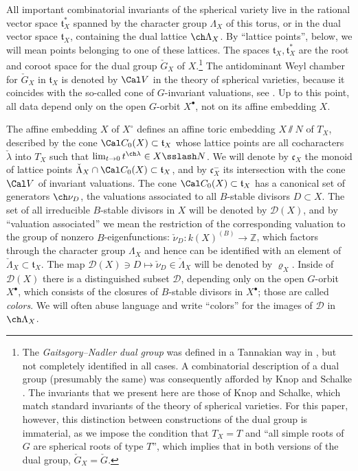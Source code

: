 All important combinatorial invariants of the spherical variety live in the rational vector space $\mathfrak t_X^*$ spanned by the character group $\Lambda_X$ of this torus, or in the dual vector space $\mathfrak t_X$, containing the dual lattice $\ch\Lambda_X$. By ``lattice points'', below, we will mean points belonging to one of these lattices. The spaces $\mathfrak t_X, \mathfrak t_X^*$ are the root and coroot space for the dual group $\check G_X$ of $X$.\footnote{The \emph{Gaitsgory--Nadler dual group} was defined in a Tannakian way in \cite{GN}, but not completely identified in all cases. A combinatorial description  of a dual group (presumably the same) was consequently afforded by Knop and Schalke \cite{Knop-Schalke}. The invariants that we present here are those of Knop and Schalke, which match standard invariants of the theory of spherical varieties. For this paper, however, this distinction between constructions of the dual group is immaterial, as we impose the condition that $T_X= T$ and ``all simple roots of $G$ are spherical roots of type $T$'', which implies that in both versions of the dual group, $\check G_X= \check G$.} The antidominant Weyl chamber for $\check G_X$ in $\mathfrak t_X$ is denoted by $\Cal V$ in the theory of spherical varieties, because it coincides with the so-called cone of $G$-invariant valuations, see \cite{KnLV}. Up to this point, all data depend only on the open $G$-orbit $X^\bullet$, not on its affine embedding $X$.

The affine embedding $X$ of $X^\circ$ defines an affine toric embedding $X\sslash N$ of $T_X$, described by the cone $\Cal C_0(X) \subset \mathfrak t_X$ whose lattice points are all cocharacters $\check\lambda$ into $T_X$ such that $\lim_{t\to 0} t^{\ch\lambda}\in X\sslash N$. We will denote by $\mathfrak c_X$ the monoid of lattice points $\check\Lambda_X \cap \Cal C_0(X) \subset \mathfrak t_X$, and by $\mathfrak c_X^-$ its intersection with the cone $\Cal V$ of invariant valuations.
The cone $\Cal C_0(X)\subset \mathfrak t_X$ has a canonical set of generators $\ch\nu_D$, the valuations associated to all $B$-stable divisors $D\subset X$. The set of all irreducible $B$-stable divisors in $X$ will be denoted by $\mathcal D(X)$, and by ``valuation associated'' we mean the restriction of the corresponding valuation to the group of nonzero $B$-eigenfunctions: $\check \nu_D: k(X)^{(B)} \to \mathbb Z$, which factors through the character group $\Lambda_X$ and hence can be identified with an element of $\check\Lambda_X\subset \mathfrak t_X$. The map $\mathcal D(X)\ni D\mapsto \check\nu_D\in \check\Lambda_X$ will be denoted by $\varrho_X$. Inside of $\mathcal D(X)$ there is a distinguished subset $\mathcal D$, depending only on the open $G$-orbit $X^\bullet$, which consists of the closures of $B$-stable divisors in $X^\bullet$; those are called \emph{colors}. We will often abuse language and write ``colors'' for the images of $\mathcal D$ in $\ch\Lambda_X$.





